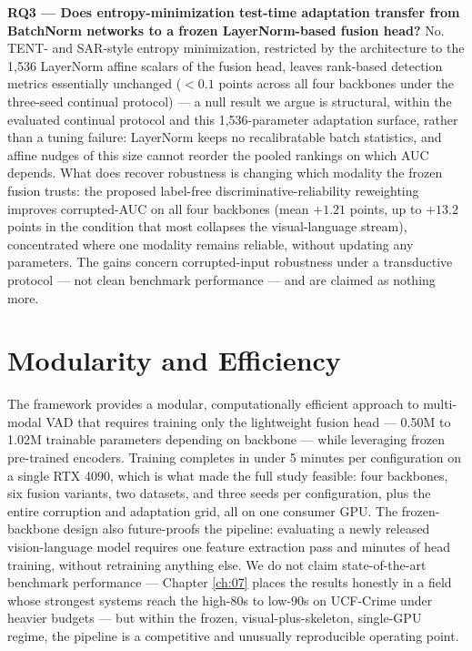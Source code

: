 \textbf{RQ3 --- Does entropy-minimization test-time adaptation transfer from
BatchNorm networks to a frozen LayerNorm-based fusion head?} No. TENT- and
SAR-style entropy minimization, restricted by the architecture to the 1{,}536
LayerNorm affine scalars of the fusion head, leaves rank-based detection
metrics essentially unchanged ($<0.1$ points across all four backbones under
the three-seed continual protocol) --- a null result we argue is structural,
within the evaluated continual protocol and this 1{,}536-parameter adaptation
surface, rather than a tuning failure: LayerNorm keeps no recalibratable
batch statistics, and affine nudges of this size cannot reorder the pooled
rankings on which AUC depends. What does
recover robustness is changing which modality the frozen fusion trusts: the
proposed label-free discriminative-reliability reweighting improves
corrupted-AUC on all four backbones (mean $+1.21$ points, up to $+13.2$ points
in the condition that most collapses the visual-language stream), concentrated
where one modality remains reliable, without updating any parameters. The gains concern
corrupted-input robustness under a transductive protocol --- not clean
benchmark performance --- and are claimed as nothing more.

\section{Modularity and Efficiency}
\label{sec:conc-modularity}

The framework provides a modular, computationally efficient approach to
multi-modal VAD that requires training only the lightweight fusion head ---
0.50M to 1.02M trainable parameters depending on backbone --- while leveraging
frozen pre-trained encoders. Training completes in under 5 minutes per
configuration on a single RTX 4090, which is what made the full study
feasible: four backbones, six fusion variants, two datasets, and three seeds
per configuration, plus the entire corruption and adaptation grid, all on one
consumer GPU. The frozen-backbone design also future-proofs the pipeline:
evaluating a newly released vision-language model requires one feature
extraction pass and minutes of head training, without retraining anything
else. We do not claim state-of-the-art benchmark performance --- Chapter
\ref{ch:07} places the results honestly in a field whose strongest systems
reach the high-80s to low-90s on UCF-Crime under heavier budgets --- but
within the frozen, visual-plus-skeleton, single-GPU regime, the pipeline is a
competitive and unusually reproducible operating point.

